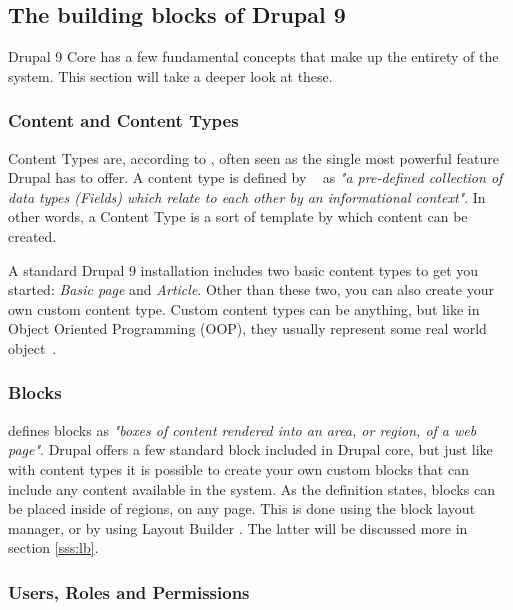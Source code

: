 
\subsection{The building blocks of Drupal 9}

Drupal 9 Core has a few fundamental concepts that make up the entirety of the system. This section will take a deeper look at these.

\subsubsection{Content and Content Types}

Content Types are, according to \textcite{Tomlinson2015}, often seen as the single most powerful feature Drupal has to offer. A content type is defined by ~\textcite{Drupal2021} as \emph{"a pre-defined collection of data types (Fields) which relate to each other by an informational context"}. In other words, a Content Type is a sort of template by which content can be created.

A standard Drupal 9 installation includes two basic content types to get you started: \emph{Basic page} and \emph{Article}. Other than these two, you can also create your own custom content type. Custom content types can be anything, but like in Object Oriented Programming (\gls{OOP}), they usually represent some real world object~\autocite{Tomlinson2015}.

\subsubsection{Blocks}
\label{sss:blocks}

\textcite{Drupal2021} defines blocks as \emph{"boxes of content rendered into an area, or region, of a web page"}. Drupal offers a few standard block included in Drupal core, but just like with content types it is possible to create your own custom blocks that can include any content available in the system. As the definition states, blocks can be placed inside of regions, on any page. This is done using the block layout manager, or by using Layout Builder \autocite{Tomlinson2015}. The latter will be discussed more in section \ref{sss:lb}.

\subsubsection{Users, Roles and Permissions}

